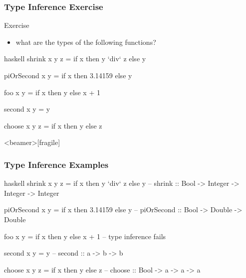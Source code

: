 \documentclass[dvipsnames]{beamer}
\theoremstyle{plain}
\begin{document}
\begin{frame}[fragile]
  \frametitle{Type Inference Exercise}

  \begin{block}{Exercise}
    \begin{itemize}
      \item what are the types of the following functions?
    \end{itemize}

    \medskip
    \begin{pygments}{haskell}
shrink x y z = if x then y `div` z else y

piOrSecond x y = if x then 3.14159 else y

foo x y = if x then y else x + 1

second x y = y

choose x y z = if x then y else z
    \end{pygments}
  \end{block}
\end{frame}

\begin{frame}<beamer>[fragile]
  \frametitle{Type Inference Examples}

  \begin{example}[Haskell]
    \begin{pygments}{haskell}
shrink x y z = if x then y `div` z else y
-- shrink :: Bool -> Integer -> Integer -> Integer

piOrSecond x y = if x then 3.14159 else y
-- piOrSecond :: Bool -> Double -> Double

foo x y = if x then y else x + 1
-- type inference fails

second x y = y
-- second :: a -> b -> b

choose x y z = if x then y else z
-- choose :: Bool -> a -> a -> a
    \end{pygments}
  \end{example}
\end{frame}
\end{document}
